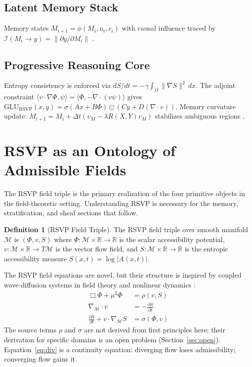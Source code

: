 \documentclass[12pt, a4paper]{article}
\theoremstyle{rsvpstyle}
\theoremstyle{definition}
\newtheorem{definition}[theorem]{Definition}
\newcommand{\OpMan}{\mathcal{M}}
\begin{document}
\subsection{Latent Memory Stack}

Memory states $M_{i+1} = \phi(M_i, u_i, c_i)$ with causal influence traced by
$\mathcal{I}(M_i \to y) = \|\partial y/\partial M_i\|$ \citep{Pearl2009}.

\subsection{Progressive Reasoning Core}

Entropy consistency is enforced via
$dS/dt = -\gamma\int_\Omega\|\nabla S\|^2\,dx$.
The adjoint constraint $\langle v\cdot\nabla\Phi, \psi\rangle = \langle\Phi,
-\nabla\cdot(v\psi)\rangle$ gives $\mathrm{GLU}_{\mathrm{RSVP}}(x,y) =
\sigma(Ax + B\Phi) \odot (Cy + D(\nabla\cdot v))$. Memory curvature update:
$M_{i+1} = M_i + \Delta t(v_M - \lambda R(X,Y)v_M)$ stabilizes ambiguous regions
\citep{Lee2013}.

\section{RSVP as an Ontology of Admissible Fields}
\label{sec:rsvp}

The RSVP field triple is the primary realization of the four primitive objects
in the field-theoretic setting. Understanding RSVP is necessary for the memory,
stratification, and sheaf sections that follow.

\begin{definition}[RSVP Field Triple]
The RSVP field triple over smooth manifold $\OpMan$ is $(\Phi, v, S)$ where
$\Phi : \OpMan\times\mathbb{R}\to\mathbb{R}$ is the scalar accessibility
potential, $v : \OpMan\times\mathbb{R}\to T\OpMan$ is the vector flow field,
and $S : \OpMan\times\mathbb{R}\to\mathbb{R}$ is the entropic accessibility
measure $S(x,t) = \log|A(x,t)|$.
\end{definition}

The RSVP field equations are novel, but their structure is inspired by coupled
wave-diffusion systems in field theory and nonlinear dynamics
\citep{Arnold1989,Tao2016}:
\begin{align}
  \Box\Phi + \mu^2\Phi &= \rho(v,S) \label{eq:scalar}\\
  \nabla_\OpMan \cdot v &= -\tfrac{\partial S}{\partial t} \label{eq:div}\\
  \tfrac{\partial S}{\partial t} + v\cdot\nabla_\OpMan S &= \sigma(\Phi,v) \label{eq:entropy}
\end{align}
The source terms $\rho$ and $\sigma$ are not derived from first principles here;
their derivation for specific domains is an open problem (Section~\ref{sec:open}).
Equation~\eqref{eq:div} is a continuity equation: diverging flow loses
admissibility; converging flow gains it.
\end{document}
